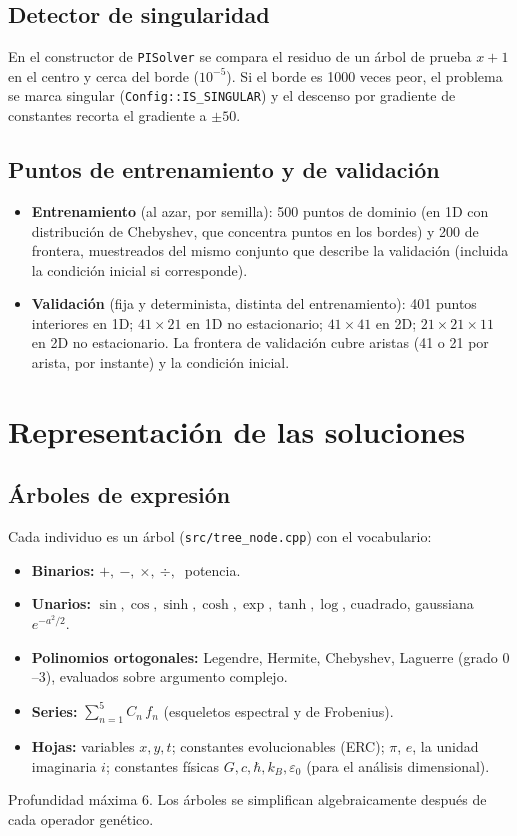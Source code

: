 \documentclass[11pt,a4paper]{article}
\newcommand{\code}[1]{\texttt{\small #1}}
\begin{document}
\subsection{Detector de singularidad}
En el constructor de \code{PISolver} se compara el residuo de un árbol de prueba $x+1$ en el centro y
cerca del borde ($10^{-5}$). Si el borde es 1000 veces peor, el problema se marca singular
(\code{Config::IS\_SINGULAR}) y el descenso por gradiente de constantes recorta el gradiente a $\pm50$.

\subsection{Puntos de entrenamiento y de validación}
\begin{itemize}
\item \textbf{Entrenamiento} (al azar, por semilla): 500 puntos de dominio (en 1D con distribución de
  Chebyshev, que concentra puntos en los bordes) y 200 de frontera, muestreados del mismo conjunto que
  describe la validación (incluida la condición inicial si corresponde).
\item \textbf{Validación} (fija y determinista, distinta del entrenamiento): 401 puntos interiores en 1D;
  $41\times21$ en 1D no estacionario; $41\times41$ en 2D; $21\times21\times11$ en 2D no estacionario. La
  frontera de validación cubre aristas (41 o 21 por arista, por instante) y la condición inicial.
\end{itemize}

\section{Representación de las soluciones}

\subsection{Árboles de expresión}
Cada individuo es un árbol (\code{src/tree\_node.cpp}) con el vocabulario:
\begin{itemize}
\item \textbf{Binarios:} $+,\ -,\ \times,\ \div,\ $ potencia.
\item \textbf{Unarios:} $\sin,\cos,\sinh,\cosh,\exp,\tanh,\log$, cuadrado, gaussiana $e^{-a^2/2}$.
\item \textbf{Polinomios ortogonales:} Legendre, Hermite, Chebyshev, Laguerre (grado $0$--$3$), evaluados
  sobre argumento complejo.
\item \textbf{Series:} $\sum_{n=1}^{5} C_n\,f_n$ (esqueletos espectral y de Frobenius).
\item \textbf{Hojas:} variables $x,y,t$; constantes evolucionables (ERC); $\pi$, $e$, la unidad
  imaginaria $i$; constantes físicas $G, c, \hbar, k_B, \varepsilon_0$ (para el análisis dimensional).
\end{itemize}
Profundidad máxima 6. Los árboles se simplifican algebraicamente después de cada operador genético.
\end{document}
